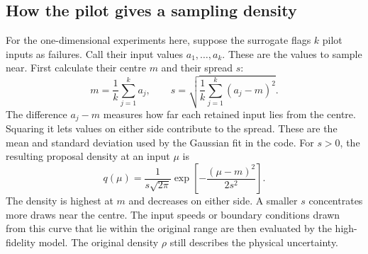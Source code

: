 \documentclass[11pt,a4paper]{article}
\begin{document}
\subsection{How the pilot gives a sampling density}
For the one-dimensional experiments here, suppose the surrogate flags $k$ pilot inputs as failures. Call their input values $a_1,\ldots,a_k$. These are the values to sample near. First calculate their centre $m$ and their spread $s$:
\begin{equation}
m=\frac{1}{k}\sum_{j=1}^k a_j,\qquad
s=\sqrt{\frac{1}{k}\sum_{j=1}^k(a_j-m)^2}.
\end{equation}
The difference $a_j-m$ measures how far each retained input lies from the centre. Squaring it lets values on either side contribute to the spread. These are the mean and standard deviation used by the Gaussian fit in the code. For $s>0$, the resulting proposal density at an input $\mu$ is
\begin{equation}
q(\mu)=\frac{1}{s\sqrt{2\pi}}
       \exp\!\left[-\frac{(\mu-m)^2}{2s^2}\right].
\end{equation}
The density is highest at $m$ and decreases on either side. A smaller $s$ concentrates more draws near the centre. The input speeds or boundary conditions drawn from this curve that lie within the original range are then evaluated by the high-fidelity model. The original density $\rho$ still describes the physical uncertainty.
\end{document}
